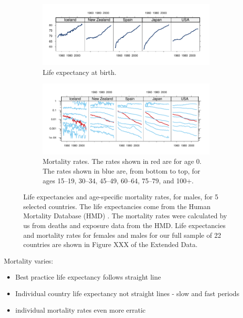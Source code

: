 \documentclass[11pt]{article}\usepackage[]{graphicx}\usepackage[]{color}
\begin{document}
\begin{figure}
\begin{subfigure}{\textwidth}
  \centering
\quad \includegraphics{out/fig_life_exp_sample}
  \caption{Life expectancy at birth.}
\end{subfigure}
\begin{subfigure}{\textwidth}
  \centering
\includegraphics{out/fig_mort_age_sample}
  \caption{Mortality rates.  The rates shown in red are for age 0.  The rates shown in blue are, from bottom to top, for ages 15--19, 30--34, 45--49, 60--64, 75--79, and 100+.}
\end{subfigure}
\caption{Life expectancies and age-specific mortality rates, for males, for 5 selected countries.  The life expectancies come from the Human Mortality Database (HMD) \citep{hmd}. The mortality rates were calculated by us from deaths and exposure data from the HMD.  Life expectancies and mortality rates for females and males for our full sample of 22 countries are shown in Figure XXX of the Extended Data.}
  \label{fig:sample_life_mort}
\end{figure}

Mortality varies:
\begin{itemize}
  \item Best practice life expectancy follows straight line
  \item Individual country life expectancy not straight lines - slow and fast periods
  \item individual mortality rates even more erratic
 \end{itemize}
 
\end{document}
